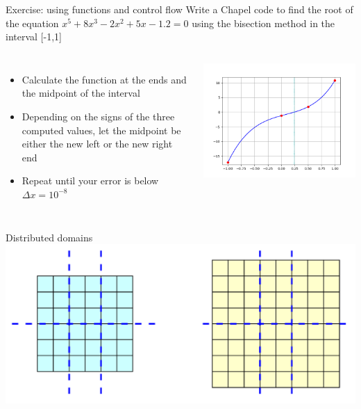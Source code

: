 \documentclass[xcolor=svgnames,aspectratio=169]{beamer}
\begin{document}
\begin{frame}{Exercise: using functions and control flow}
  Write a Chapel code to find the root of the equation $x^5 + 8x^3 - 2x^2 + 5x - 1.2 = 0$ using the bisection
  method in the interval [-1,1]
  \begin{columns}[]
    \begin{itemize}\setlength{\itemsep}{3mm}
      \item Calculate the function at the ends and the midpoint of the interval
      \item Depending on the signs of the three computed values, let the midpoint be either the new left
      or the new right end
      \item Repeat until your error is below $\Delta x=10^{-8}$
    \end{itemize}
    \includegraphics[width=0.95\columnwidth]{figs/bisection.png}
  \end{columns}
\end{frame}



\begin{frame}{Distributed domains}
  \includegraphics[width=1.0\columnwidth]{domains.pdf}
\end{frame}
\end{document}
